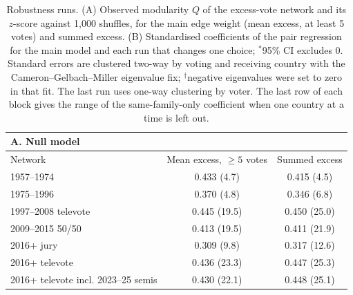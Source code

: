 \begin{table}[t]
\centering
\caption{Robustness runs. (A) Observed modularity $Q$ of the excess-vote network and its $z$-score against 1,000 shuffles, for the main edge weight (mean excess, at least 5 votes) and summed excess. (B) Standardised coefficients of the pair regression for the main model and each run that changes one choice; $^{*}$95\% CI excludes 0. Standard errors are clustered two-way by voting and receiving country with the Cameron--Gelbach--Miller eigenvalue fix; $^{\dagger}$negative eigenvalues were set to zero in that fit. The last run uses one-way clustering by voter. The last row of each block gives the range of the same-family-only coefficient when one country at a time is left out.}
\label{tab:robustness}
\small
\begin{tabular}{lcc}
\multicolumn{3}{l}{\textbf{A. Null model}} \\ \hline
Network & Mean excess, $\geq 5$ votes & Summed excess \\ \hline
1957--1974 & 0.433 (4.7) & 0.415 (4.5) \\
1975--1996 & 0.370 (4.8) & 0.346 (6.8) \\
1997--2008 televote & 0.445 (19.5) & 0.450 (25.0) \\
2009--2015 50/50 & 0.413 (19.5) & 0.411 (21.9) \\
2016+ jury & 0.309 (9.8) & 0.317 (12.6) \\
2016+ televote & 0.436 (23.3) & 0.447 (25.3) \\
2016+ televote incl. 2023--25 semis & 0.430 (22.1) & 0.448 (25.1) \\
\hline
\end{tabular}

\vspace{6pt}


\end{table}
